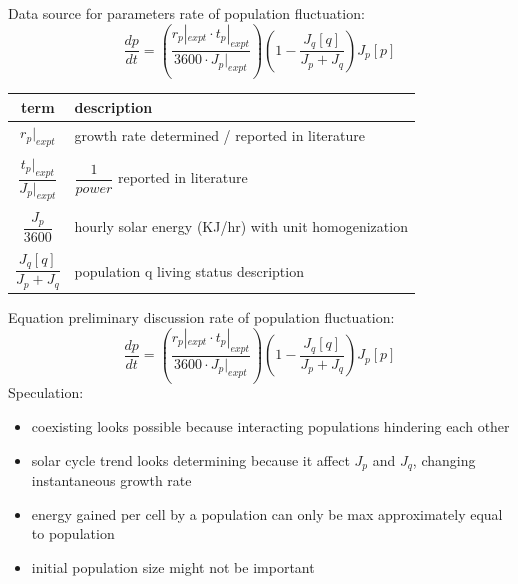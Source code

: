 \documentclass[xcolor=x11names,compress]{beamer}
\begin{document}
\begin{frame}{Data source for parameters}
    rate of population fluctuation:
    \begin{equation*}
        \dfrac{dp}{dt} = (\dfrac{r_p|_{expt}\cdot t_p|_{expt}}{3600\cdot J_p|_{expt}})(1-\dfrac{J_q[q]}{J_p + J_q})J_p[p]
    \end{equation*}
    \begin{longtable}{c|p{.8\linewidth}}
        term & description \\\hline
        $r_p|_{expt}$ & growth rate determined / reported in literature \\&\\
        $\dfrac{t_p|_{expt}}{J_p|_{expt}}$ & $\dfrac{1}{power}$ reported in literature \\&\\
        $\dfrac{J_p}{3600}$ & hourly solar energy (KJ/hr) with unit homogenization \\&\\
        $\dfrac{J_q[q]}{J_p + J_q}$ & population q living status description
    \end{longtable}
\end{frame}

\begin{frame}{Equation preliminary discussion}
    rate of population fluctuation:
    \begin{equation*}
        \dfrac{dp}{dt} = (\dfrac{r_p|_{expt}\cdot t_p|_{expt}}{3600\cdot J_p|_{expt}})(1-\dfrac{J_q[q]}{J_p + J_q})J_p[p]
    \end{equation*}
    Speculation:
    \begin{itemize}\itemsep10pt
        \item coexisting looks possible because interacting populations hindering each other
        \item solar cycle trend looks determining because it affect $J_p$ and $J_q$, changing instantaneous growth rate
        \item energy gained per cell by a population can only be max approximately equal to population
        \item initial population size might not be important
    \end{itemize}
\end{frame}
\end{document}
